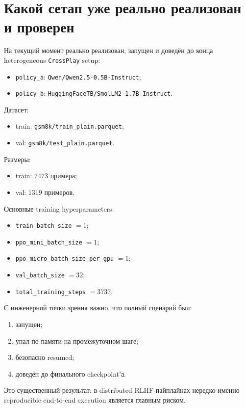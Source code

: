 \documentclass[11pt,a4paper]{article}
\begin{document}
\section{Какой сетап уже реально реализован и проверен}

На текущий момент реально реализован, запущен и доведён до конца heterogeneous \texttt{CrossPlay} setup:
\begin{itemize}
  \item \texttt{policy\_a}: \texttt{Qwen/Qwen2.5-0.5B-Instruct};
  \item \texttt{policy\_b}: \texttt{HuggingFaceTB/SmolLM2-1.7B-Instruct}.
\end{itemize}

Датасет:
\begin{itemize}
  \item train: \texttt{gsm8k/train\_plain.parquet};
  \item val: \texttt{gsm8k/test\_plain.parquet}.
\end{itemize}

Размеры:
\begin{itemize}
  \item train: $7473$ примера;
  \item val: $1319$ примеров.
\end{itemize}

Основные training hyperparameters:
\begin{itemize}
  \item \texttt{train\_batch\_size} $= 1$;
  \item \texttt{ppo\_mini\_batch\_size} $= 1$;
  \item \texttt{ppo\_micro\_batch\_size\_per\_gpu} $= 1$;
  \item \texttt{val\_batch\_size} $= 32$;
  \item \texttt{total\_training\_steps} $= 3737$.
\end{itemize}

С инженерной точки зрения важно, что полный сценарий был:
\begin{enumerate}[label=\arabic*.]
  \item запущен;
  \item упал по памяти на промежуточном шаге;
  \item безопасно resumed;
  \item доведён до финального checkpoint'а.
\end{enumerate}

Это существенный результат: в distributed RLHF-пайплайнах нередко именно reproducible end-to-end execution является главным риском.
\end{document}
